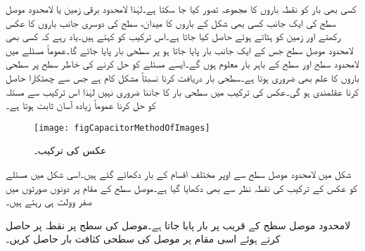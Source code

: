 کسی بھی بار کو نقطہ باروں کا مجموعہ تصور کیا جا سکتا ہے۔لہٰذا لامحدود برقی زمین یا لامحدود موصل سطح  کی ایک جانب کسی بھی شکل کے باروں  کا میدان، سطح کی دوسری جانب باروں کا عکس رکھتے اور زمین کو ہٹاتے ہوئے حاصل کیا جاتا ہے۔اس ترکیب کو  کہتے ہیں۔یاد رہے کہ کسی بھی لامحدود موصل سطح جس کے ایک جانب بار پایا جاتا ہو پر سطحی بار پایا جائے گا۔عموماً مسئلے میں لامحدود سطح اور سطح کے باہر بار معلوم ہوں گے۔ایسے مسئلے کو حل کرنے کی خاطر سطح پر سطحی باروں کا علم بھی ضروری ہوتا ہے۔سطحی بار دریافت کرنا نسبتاً مشکل کام ہے جس سے چھٹکارا حاصل کرنا عقلمندی ہو گی۔عکس کی ترکیب میں سطحی بار کا جاننا ضروری نہیں لہٰذا اس ترکیب سے مسئلہ کو حل کرنا عموماً زیادہ آسان ثابت ہوتا ہے۔
\begin{figure}
\centering
\texttt{[image: figCapacitorMethodOfImages]}
\caption{عکس کی ترکیب۔}
\label{شکل_کپیسٹر_عکس_کی_ترکیب}
\end{figure}

شکل   میں لامحدود موصل سطح سے اوپر مختلف اقسام کے بار دکھائے گئے ہیں۔اسی شکل میں مسئلے کو عکس کے ترکیب کی نقطہ نظر سے بھی دکھایا گیا ہے۔موصل سطح کے مقام پر دونوں صورتوں میں صفر وولٹ ہی رہتے ہیں۔ 

 لامحدود موصل سطح  کے قریب  پر  بار پایا جاتا ہے۔موصل کی سطح پر نقطہ  پر  حاصل کرتے ہوئے اسی مقام پر موصل کی سطحی کثافت بار حاصل کریں۔

